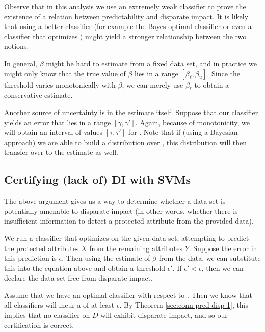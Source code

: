 Observe that in this analysis we use an extremely weak classifier to prove the
existence of a relation between predictability and disparate impact. It is
likely that using a better classifier (for example the Bayes optimal classifier or even a classifier that optimizes \ber) might yield a stronger relationship between the two notions. 

\vspace*{0.1in} In general, $\beta$ might be
hard to estimate from a fixed data set, and in practice we might only know that
the true value of $\beta$ lies in a range $[\beta_\ell, \beta_u]$. Since the
\ber threshold varies monotonically with $\beta$, we can merely use $\beta_\ell$
to obtain a conservative estimate. 

Another source of uncertainty is in the \ber estimate itself. Suppose that our
classifier yields an error that lies in a range $[\gamma, \gamma']$. Again,
because of monotonicity, we will obtain an interval of values $[\tau, \tau']$
for \di. Note that if (using a Bayesian approach) we are able to build a
distribution over \ber, this distribution will then transfer over to the \di
estimate as well. 

\subsection{Certifying (lack of) DI with SVMs}
\label{sec:certifying-lack-of}

The above argument gives us a way to determine whether a data set is potentially
amenable to disparate impact (in other words, whether there is insufficient
information to detect a protected attribute from the provided data).

 \vspace*{0.1in}
We run a classifier that optimizes \ber on the given data set, attempting to
predict the protected attributes $X$ from the remaining attributes $Y$.  Suppose
the error in this prediction is $\epsilon$. Then using the estimate of $\beta$
from the data, we can substitute this into the equation above and obtain a
threshold $\epsilon'$.  If $\epsilon' < \epsilon$, then we can declare the data
set free from disparate impact. 

 Assume that we have an optimal classifier with respect to \ber. Then we know
that all classifiers will incur a \ber of at least $\epsilon$. By Theorem
\ref{sec:conn-pred-disp-1}, this implies that no classifier on $D$ will exhibit
disparate impact, and so our certification is correct. 

